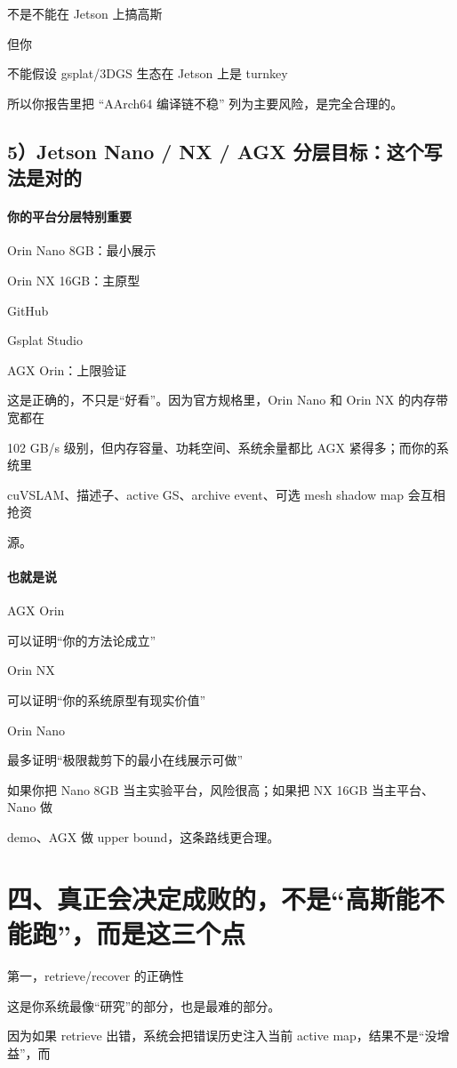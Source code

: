 \documentclass[12pt]{article}
\begin{document}
不是不能在 Jetson 上搞高斯

但你

不能假设 gsplat/3DGS 生态在 Jetson 上是 turnkey

所以你报告里把 “AArch64 编译链不稳” 列为主要风险，是完全合理的。

\subsection{5）Jetson Nano / NX / AGX 分层目标：这个写法是对的}
\paragraph{你的平台分层特别重要}
Orin Nano 8GB：最小展示

Orin NX 16GB：主原型

GitHub

Gsplat Studio

AGX Orin：上限验证

这是正确的，不只是“好看”。因为官方规格里，Orin Nano 和 Orin NX 的内存带宽都在

102 GB/s 级别，但内存容量、功耗空间、系统余量都比 AGX 紧得多；而你的系统里

cuVSLAM、描述子、active GS、archive event、可选 mesh shadow map 会互相抢资

源。

\paragraph{也就是说}
AGX Orin

可以证明“你的方法论成立”

Orin NX

可以证明“你的系统原型有现实价值”

Orin Nano

最多证明“极限裁剪下的最小在线展示可做”

如果你把 Nano 8GB 当主实验平台，风险很高；如果把 NX 16GB 当主平台、Nano 做

demo、AGX 做 upper bound，这条路线更合理。

\section{四、真正会决定成败的，不是“高斯能不能跑”，而是这三个点}
第一，retrieve/recover 的正确性

这是你系统最像“研究”的部分，也是最难的部分。

因为如果 retrieve 出错，系统会把错误历史注入当前 active map，结果不是“没增益”，而
\end{document}

